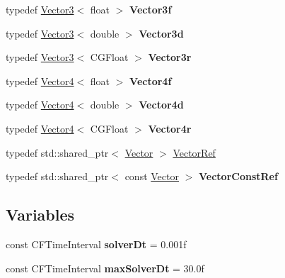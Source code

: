 \begin{DoxyCompactItemize}
\item 
\mbox{\label{namespace_p_o_p_aa631800a29b89df9f2e3c4d246bff001}} 
typedef \mbox{\hyperlink{struct_p_o_p_1_1_vector3}{Vector3}}$<$ float $>$ {\bfseries Vector3f}
\item 
\mbox{\label{namespace_p_o_p_a5eeef806e5ec27150f5ad56cae2914a2}} 
typedef \mbox{\hyperlink{struct_p_o_p_1_1_vector3}{Vector3}}$<$ double $>$ {\bfseries Vector3d}
\item 
\mbox{\label{namespace_p_o_p_a381509369b72b528dbe7d3422099e6c7}} 
typedef \mbox{\hyperlink{struct_p_o_p_1_1_vector3}{Vector3}}$<$ C\+G\+Float $>$ {\bfseries Vector3r}
\item 
\mbox{\label{namespace_p_o_p_abb6ea5bb0ef6a756b611d31d286c3cd8}} 
typedef \mbox{\hyperlink{struct_p_o_p_1_1_vector4}{Vector4}}$<$ float $>$ {\bfseries Vector4f}
\item 
\mbox{\label{namespace_p_o_p_ac888eef00315520df7cfbb1a442f1347}} 
typedef \mbox{\hyperlink{struct_p_o_p_1_1_vector4}{Vector4}}$<$ double $>$ {\bfseries Vector4d}
\item 
\mbox{\label{namespace_p_o_p_a3a688270349565fd81caf394b02911de}} 
typedef \mbox{\hyperlink{struct_p_o_p_1_1_vector4}{Vector4}}$<$ C\+G\+Float $>$ {\bfseries Vector4r}
\item 
typedef std\+::shared\+\_\+ptr$<$ \mbox{\hyperlink{class_p_o_p_1_1_vector}{Vector}} $>$ \mbox{\hyperlink{namespace_p_o_p_ae9f6819a2172ed569526091e357712f5}{Vector\+Ref}}
\item 
\mbox{\label{namespace_p_o_p_a3dbd43ec94ed4ee5e1eec020cf167c59}} 
typedef std\+::shared\+\_\+ptr$<$ const \mbox{\hyperlink{class_p_o_p_1_1_vector}{Vector}} $>$ {\bfseries Vector\+Const\+Ref}
\end{DoxyCompactItemize}
\subsection*{Variables}
\begin{DoxyCompactItemize}
\item 
\mbox{\label{namespace_p_o_p_a80e3ffc436e857f60306c8f9ef5df03d}} 
const C\+F\+Time\+Interval {\bfseries solver\+Dt} = 0.\+001f
\item 
\mbox{\label{namespace_p_o_p_acbb1c223af5e2b4f4905b0f2ded51726}} 
const C\+F\+Time\+Interval {\bfseries max\+Solver\+Dt} = 30.\+0f
\end{DoxyCompactItemize}


